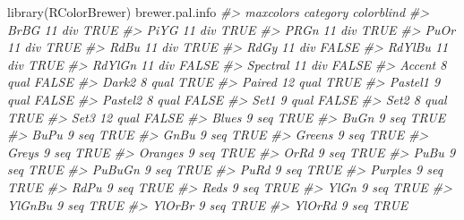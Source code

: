 \documentclass[
]{book}
\newenvironment{Shaded}{\begin{snugshade}}{\end{snugshade}}
\newcommand{\CommentTok}[1]{\textcolor[rgb]{0.56,0.35,0.01}{\textit{#1}}}
\newcommand{\FunctionTok}[1]{\textcolor[rgb]{0.00,0.00,0.00}{#1}}
\newcommand{\NormalTok}[1]{#1}
\begin{document}
\begin{Shaded}
\begin{Highlighting}[]
\FunctionTok{library}\NormalTok{(RColorBrewer)}
\NormalTok{brewer.pal.info}
\CommentTok{\#\textgreater{}          maxcolors category colorblind}
\CommentTok{\#\textgreater{} BrBG            11      div       TRUE}
\CommentTok{\#\textgreater{} PiYG            11      div       TRUE}
\CommentTok{\#\textgreater{} PRGn            11      div       TRUE}
\CommentTok{\#\textgreater{} PuOr            11      div       TRUE}
\CommentTok{\#\textgreater{} RdBu            11      div       TRUE}
\CommentTok{\#\textgreater{} RdGy            11      div      FALSE}
\CommentTok{\#\textgreater{} RdYlBu          11      div       TRUE}
\CommentTok{\#\textgreater{} RdYlGn          11      div      FALSE}
\CommentTok{\#\textgreater{} Spectral        11      div      FALSE}
\CommentTok{\#\textgreater{} Accent           8     qual      FALSE}
\CommentTok{\#\textgreater{} Dark2            8     qual       TRUE}
\CommentTok{\#\textgreater{} Paired          12     qual       TRUE}
\CommentTok{\#\textgreater{} Pastel1          9     qual      FALSE}
\CommentTok{\#\textgreater{} Pastel2          8     qual      FALSE}
\CommentTok{\#\textgreater{} Set1             9     qual      FALSE}
\CommentTok{\#\textgreater{} Set2             8     qual       TRUE}
\CommentTok{\#\textgreater{} Set3            12     qual      FALSE}
\CommentTok{\#\textgreater{} Blues            9      seq       TRUE}
\CommentTok{\#\textgreater{} BuGn             9      seq       TRUE}
\CommentTok{\#\textgreater{} BuPu             9      seq       TRUE}
\CommentTok{\#\textgreater{} GnBu             9      seq       TRUE}
\CommentTok{\#\textgreater{} Greens           9      seq       TRUE}
\CommentTok{\#\textgreater{} Greys            9      seq       TRUE}
\CommentTok{\#\textgreater{} Oranges          9      seq       TRUE}
\CommentTok{\#\textgreater{} OrRd             9      seq       TRUE}
\CommentTok{\#\textgreater{} PuBu             9      seq       TRUE}
\CommentTok{\#\textgreater{} PuBuGn           9      seq       TRUE}
\CommentTok{\#\textgreater{} PuRd             9      seq       TRUE}
\CommentTok{\#\textgreater{} Purples          9      seq       TRUE}
\CommentTok{\#\textgreater{} RdPu             9      seq       TRUE}
\CommentTok{\#\textgreater{} Reds             9      seq       TRUE}
\CommentTok{\#\textgreater{} YlGn             9      seq       TRUE}
\CommentTok{\#\textgreater{} YlGnBu           9      seq       TRUE}
\CommentTok{\#\textgreater{} YlOrBr           9      seq       TRUE}
\CommentTok{\#\textgreater{} YlOrRd           9      seq       TRUE}
\end{Highlighting}
\end{Shaded}
\end{document}

